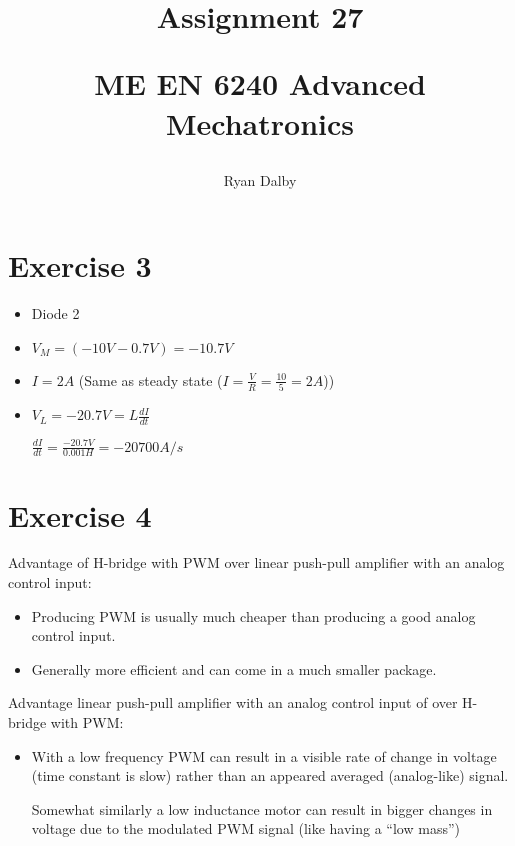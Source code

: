 \documentclass[12pt]{article}
\title{
    Assignment 27 

    \large{
        ME EN 6240 Advanced Mechatronics
    }  
}
\author{
        Ryan Dalby
}
\date{\displaydate{date}}
\begin{document}
\maketitle

\section*{Exercise 3}
\begin{itemize}
    \item 
    Diode 2

    \item 
    $V_M = (-10V-0.7V) = -10.7V$
    

    \item 
    $I = 2A$ (Same as steady state ($I=\frac{V}{R}=\frac{10}{5} = 2A$))

    \item 
    $V_L = -20.7V = L \frac{dI}{dt}$ 


    $\frac{dI}{dt} = \frac{-20.7 V}{0.001 H} = -20700 A/s$


\end{itemize}

\section*{Exercise 4}
Advantage of H-bridge with PWM over linear push-pull amplifier with an analog control input:
\begin{itemize}
    \item 
    Producing PWM is usually much cheaper than producing a good analog control input.

    \item
    Generally more efficient and can come in a much smaller package.


\end{itemize}

Advantage linear push-pull amplifier with an analog control input of over H-bridge with PWM:
\begin{itemize}
    \item 
    With a low frequency PWM can result in a visible rate of change in voltage (time constant is slow) rather than an appeared averaged (analog-like) signal.

    Somewhat similarly a low inductance motor can result in bigger changes in voltage due to the modulated PWM signal (like having a ``low mass'')
\end{itemize}
\end{document}
